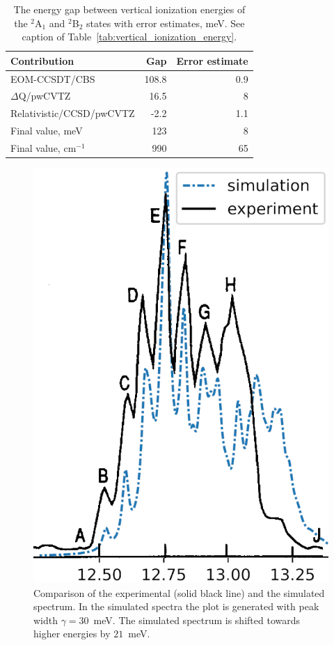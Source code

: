 \documentclass[12pt,a4paper,prb,aps,superscriptaddress]{revtex4}
\begin{document}
\begin{table}
    \caption{
        The energy gap between vertical ionization energies of the $^2$A$_1$
        and $^2$B$_2$ states with error estimates, meV. See caption of
        Table~\ref{tab:vertical_ionization_energy}.
    }
    \label{tab:vertical_gap}
    \begin{center}
        \begin{tabular}[c]{|l|r|r|}
            \hline
            Contribution             &  Gap    & Error estimate \\ \hline
            EOM-CCSDT/CBS            &  108.8  & 0.9 \\
            $\Delta$Q/pwCVTZ         &   16.5  & 8 \\
            Relativistic/CCSD/pwCVTZ &   -2.2  & 1.1 \\ \hline
            Final value, meV         &  123    & 8 \\
            Final value, cm$^{-1}$   &  990    & 65 \\ \hline
        \end{tabular}
    \end{center}
\end{table}

\begin{figure}
\includegraphics[width = 8 cm]{figures/sim_vs_Dyke}
\caption{
    Comparison of the experimental (solid black line) and the simulated
    spectrum. In the simulated spectra the plot is generated with peak width
    $\gamma = 30$~meV. The simulated spectrum is shifted towards higher
    energies by $21$~meV.
}
\label{fig:sim_vs_dyke}
\end{figure}
\end{document}
